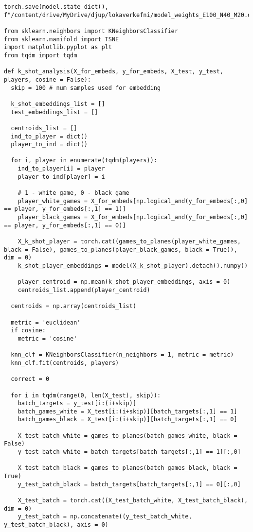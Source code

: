 \begin{verbatim}
torch.save(model.state_dict(), f"/content/drive/MyDrive/djup/lokaverkefni/model_weights_E100_N40_M20.dat")

from sklearn.neighbors import KNeighborsClassifier
from sklearn.manifold import TSNE
import matplotlib.pyplot as plt
from tqdm import tqdm

def k_shot_analysis(X_for_embeds, y_for_embeds, X_test, y_test, players, cosine = False):
  skip = 100 # num samples used for embedding

  k_shot_embeddings_list = []
  test_embeddings_list = []

  centroids_list = []
  ind_to_player = dict()
  player_to_ind = dict()

  for i, player in enumerate(tqdm(players)):
    ind_to_player[i] = player
    player_to_ind[player] = i

    # 1 - white game, 0 - black game
    player_white_games = X_for_embeds[np.logical_and(y_for_embeds[:,0] == player, y_for_embeds[:,1] == 1)]
    player_black_games = X_for_embeds[np.logical_and(y_for_embeds[:,0] == player, y_for_embeds[:,1] == 0)]

    X_k_shot_player = torch.cat((games_to_planes(player_white_games, black = False), games_to_planes(player_black_games, black = True)), dim = 0)
    k_shot_player_embeddings = model(X_k_shot_player).detach().numpy()

    player_centroid = np.mean(k_shot_player_embeddings, axis = 0)
    centroids_list.append(player_centroid)

  centroids = np.array(centroids_list)

  metric = 'euclidean'
  if cosine:
    metric = 'cosine'

  knn_clf = KNeighborsClassifier(n_neighbors = 1, metric = metric)
  knn_clf.fit(centroids, players)

  correct = 0

  for i in tqdm(range(0, len(X_test), skip)):
    batch_targets = y_test[i:(i+skip)]
    batch_games_white = X_test[i:(i+skip)][batch_targets[:,1] == 1]
    batch_games_black = X_test[i:(i+skip)][batch_targets[:,1] == 0]
    
    X_test_batch_white = games_to_planes(batch_games_white, black = False)
    y_test_batch_white = batch_targets[batch_targets[:,1] == 1][:,0]

    X_test_batch_black = games_to_planes(batch_games_black, black = True)
    y_test_batch_black = batch_targets[batch_targets[:,1] == 0][:,0]

    X_test_batch = torch.cat((X_test_batch_white, X_test_batch_black), dim = 0)
    y_test_batch = np.concatenate((y_test_batch_white, y_test_batch_black), axis = 0)


\end{verbatim}

